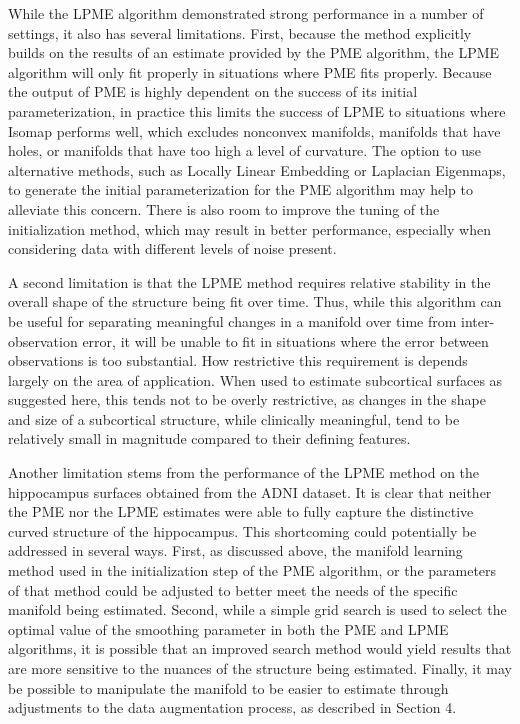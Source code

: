 \documentclass[11pt,reqno]{article}
\theoremstyle{definition}
\begin{document}
While the LPME algorithm demonstrated strong performance in a number of settings, it also has several limitations. First, because the method explicitly builds on the results of an estimate provided by the PME algorithm, the LPME algorithm will only fit properly in situations where PME fits properly. Because the output of PME is highly dependent on the success of its initial parameterization, in practice this limits the success of LPME to situations where Isomap performs well, which excludes nonconvex manifolds, manifolds that have holes, or manifolds that have too high a level of curvature. The option to use alternative methods, such as Locally Linear Embedding or Laplacian Eigenmaps, to generate the initial parameterization for the PME algorithm may help to alleviate this concern. There is also room to improve the tuning of the initialization method, which may result in better performance, especially when considering data with different levels of noise present.  

A second limitation is that the LPME method requires relative stability in the overall shape of the structure being fit over time. Thus, while this algorithm can be useful for separating meaningful changes in a manifold over time from inter-observation error, it will be unable to fit in situations where the error between observations is too substantial. How restrictive this requirement is depends largely on the area of application. When used to estimate subcortical surfaces as suggested here, this tends not to be overly restrictive, as changes in the shape and size of a subcortical structure, while clinically meaningful, tend to be relatively small in magnitude compared to their defining features.

Another limitation stems from the performance of the LPME method on the hippocampus surfaces obtained from the ADNI dataset. It is clear that neither the PME nor the LPME estimates were able to fully capture the distinctive curved structure of the hippocampus. This shortcoming could potentially be addressed in several ways. First, as discussed above, the manifold learning method used in the initialization step of the PME algorithm, or the parameters of that method could be adjusted to better meet the needs of the specific manifold being estimated. Second, while a simple grid search is used to select the optimal value of the smoothing parameter in both the PME and LPME algorithms, it is possible that an improved search method would yield results that are more sensitive to the nuances of the structure being estimated. Finally, it may be possible to manipulate the manifold to be easier to estimate through adjustments to the data augmentation process, as described in Section 4. 
\end{document}
